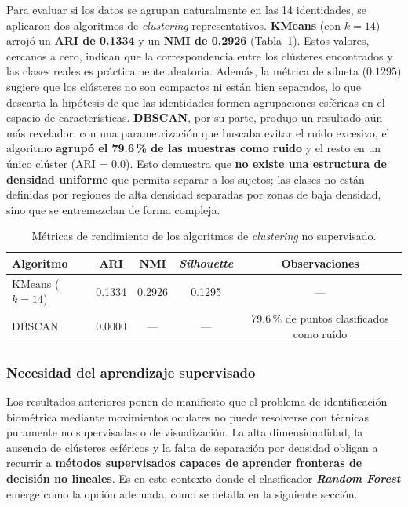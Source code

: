 Para evaluar si los datos se agrupan naturalmente en las 14 identidades, se aplicaron dos algoritmos de \textit{clustering} representativos.
\textbf{KMeans} (con \(k=14\)) arrojó un \textbf{ARI de 0.1334} y un \textbf{NMI de 0.2926} (Tabla~\ref{tab:resumen_clustering}).
Estos valores, cercanos a cero, indican que la correspondencia entre los clústeres encontrados y las clases reales es prácticamente aleatoria.
Además, la métrica de silueta (\(0.1295\)) sugiere que los clústeres no son compactos ni están bien separados, lo que descarta la hipótesis de que las identidades formen agrupaciones esféricas en el espacio de características.
\textbf{DBSCAN}, por su parte, produjo un resultado aún más revelador: con una parametrización que buscaba evitar el ruido excesivo, el algoritmo \textbf{agrupó el 79.6\,\% de las muestras como ruido} y el resto en un único clúster (ARI = 0.0).
Esto demuestra que \textbf{no existe una estructura de densidad uniforme} que permita separar a los sujetos;
las clases no están definidas por regiones de alta densidad separadas por zonas de baja densidad, sino que se entremezclan de forma compleja.
\begin{table}[H]
	\centering
	\caption{Métricas de rendimiento de los algoritmos de \textit{clustering} no supervisado.}
	\label{tab:resumen_clustering}
	\begin{tabular}{lcccc}
		\toprule
		\textbf{Algoritmo} & \textbf{ARI} & \textbf{NMI} & \textbf{\textit{Silhouette}} & \textbf{Observaciones} \\
		\midrule
		KMeans ($k=14$) & 0.1334 & 0.2926 & 0.1295 & --- \\
		DBSCAN          & 0.0000 & ---    & ---    & 79.6\,\% de puntos clasificados como ruido \\
		\bottomrule
	\end{tabular}
\end{table}

\subsubsection{Necesidad del aprendizaje supervisado}

Los resultados anteriores ponen de manifiesto que el problema de identificación biométrica mediante movimientos oculares no puede resolverse con técnicas puramente no supervisadas o de visualización.
La alta dimensionalidad, la ausencia de clústeres esféricos y la falta de separación por densidad obligan a recurrir a \textbf{métodos supervisados capaces de aprender fronteras de decisión no lineales}.
Es en este contexto donde el clasificador \textbf{\textit{Random Forest}} emerge como la opción adecuada, como se detalla en la siguiente sección.
